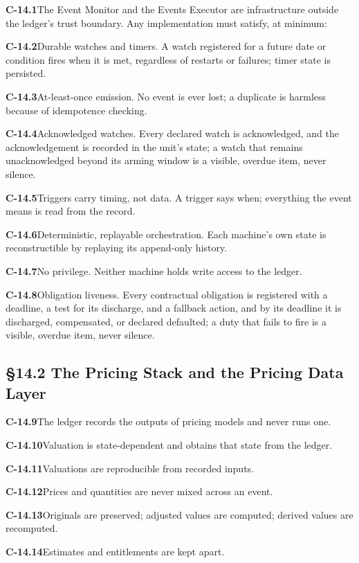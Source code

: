 \documentclass[11pt,a4paper]{article}
\newcommand{\clause}[2]{\par\medskip\noindent\textbf{#1}\hspace{0.6em}#2}
\begin{document}
\clause{C-14.1}{The Event Monitor and the Events Executor are infrastructure
outside the ledger's trust boundary. Any implementation must satisfy, at
minimum:}

\clause{C-14.2}{Durable watches and timers. A watch registered for a future date or
condition fires when it is met, regardless of restarts or failures; timer state is
persisted.}

\clause{C-14.3}{At-least-once emission. No event is ever lost; a duplicate is
harmless because of idempotence checking.}

\clause{C-14.4}{Acknowledged watches. Every declared watch is acknowledged, and the
acknowledgement is recorded in the unit's state; a watch that remains
unacknowledged beyond its arming window is a visible, overdue item, never
silence.}

\clause{C-14.5}{Triggers carry timing, not data. A trigger says when; everything
the event means is read from the record.}

\clause{C-14.6}{Deterministic, replayable orchestration. Each machine's own state
is reconstructible by replaying its append-only history.}

\clause{C-14.7}{No privilege. Neither machine holds write access to the ledger.}

\clause{C-14.8}{Obligation liveness. Every contractual obligation is registered
with a deadline, a test for its discharge, and a fallback action, and by its
deadline it is discharged, compensated, or declared defaulted; a duty that fails to
fire is a visible, overdue item, never silence.}

\subsection*{\S14.2 The Pricing Stack and the Pricing Data Layer}

\clause{C-14.9}{The ledger records the outputs of pricing models and never runs
one.}

\clause{C-14.10}{Valuation is state-dependent and obtains that state from the
ledger.}

\clause{C-14.11}{Valuations are reproducible from recorded inputs.}

\clause{C-14.12}{Prices and quantities are never mixed across an event.}

\clause{C-14.13}{Originals are preserved; adjusted values are computed; derived
values are recomputed.}

\clause{C-14.14}{Estimates and entitlements are kept apart.}
\end{document}
